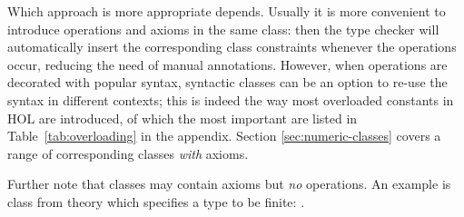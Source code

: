 \begin{isabellebody}
\begin{isamarkuptext}
Which approach is more appropriate depends.  Usually it is more
convenient to introduce operations and axioms in the same class: then
the type checker will automatically insert the corresponding class
constraints whenever the operations occur, reducing the need of manual
annotations.  However, when operations are decorated with popular
syntax, syntactic classes can be an option to re-use the syntax in
different contexts; this is indeed the way most overloaded constants
in HOL are introduced, of which the most important are listed in
Table~\ref{tab:overloading} in the appendix.  Section
\ref{sec:numeric-classes} covers a range of corresponding classes
\emph{with} axioms.

Further note that classes may contain axioms but \emph{no} operations.
An example is class  from theory \hyperlink{theory.Finite-Set}{\mbox{}}
which specifies a type to be finite: .%
\end{isamarkuptext}%
\isamarkuptrue%
%
\isadelimtheory
%
\endisadelimtheory
%
\isatagtheory
%
\endisatagtheory
{\isafoldtheory}%
%
\isadelimtheory
%
\endisadelimtheory
\end{isabellebody}%
